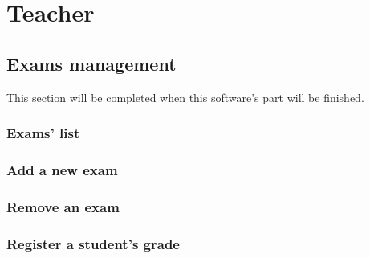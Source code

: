 \documentclass[ManualeUtente.tex]{subfiles}
\begin{document}
\chapter{Teacher}
\section{Exams management}
This section will be completed when this software's part will be finished.
\subsection{Exams' list}
\subsection{Add a new exam}
\subsection{Remove an exam}
\subsection{Register a student's grade}
\end{document}
